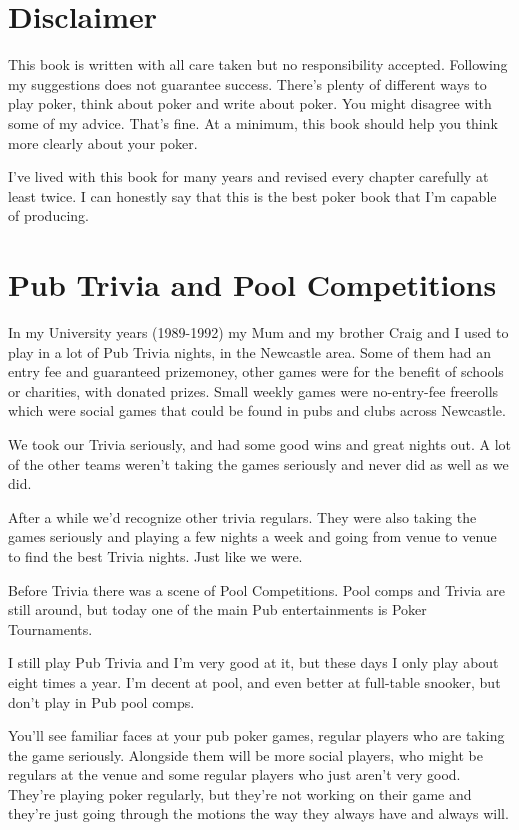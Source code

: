 \section{Disclaimer}

This book is written with all care taken but no responsibility accepted.
Following my suggestions does not guarantee success.
There's plenty of different ways to play poker, think about poker
and write about poker. You might disagree with some of my advice.
That's fine. At a minimum, this book should help you think
more clearly about your poker.

I've lived with this book for many years and revised every chapter
carefully at least twice. I can honestly say that this is the best
poker book that I'm capable of producing.

\section{Pub Trivia and Pool Competitions}

In my University years (1989-1992) my Mum and my brother Craig and I
used to play in a lot of Pub Trivia nights, in the Newcastle
area. Some of them had an entry fee and guaranteed prizemoney, other
games were for the benefit of schools or charities, with donated
prizes. Small weekly games were no-entry-fee freerolls which were
social games that could be found in pubs and clubs across Newcastle.

We took our Trivia seriously, and had some good wins and
great nights out. A lot of the other teams weren't taking the games
seriously and never did as well as we did.

After a while we'd recognize other trivia regulars. They were also
taking the games seriously and playing a few nights a week and going
from venue to venue to find the best Trivia nights. Just like we
were.

Before Trivia there was a scene of Pool Competitions. Pool
comps and Trivia are still around, but today one of the main Pub
entertainments is Poker Tournaments.

I still play Pub Trivia and I'm very good at it, but these days
I only play about eight times a year. I'm decent at pool, and even
better at full-table snooker, but don't play in Pub pool comps.

You'll see familiar faces at your pub poker games,
regular players who are taking the game seriously. Alongside them
will be more social players, who might be regulars at the venue
and some regular players who just aren't very good. They're playing
poker regularly, but they're not working on their game and they're
just going through the motions the way they always have and always
will.

